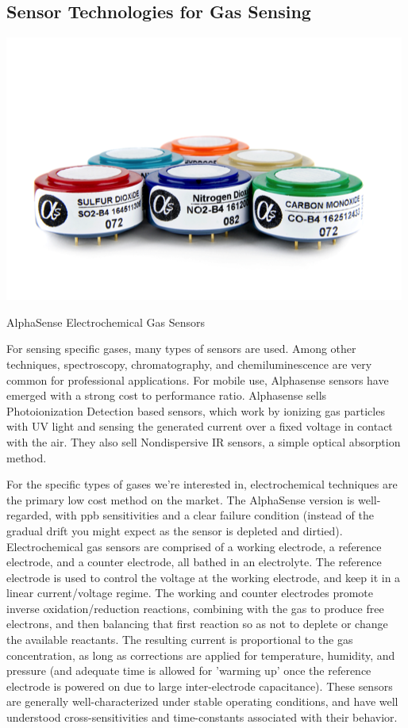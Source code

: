 \subsection{Sensor Technologies for Gas Sensing}

\begin{marginfigure}[3.5cm]
 	\includegraphics[width=\textwidth]{visuals/as_gas}               
 	 \caption{AlphaSense Electrochemical Gas Sensors}
  	\label{fig:as_gas}
\end{marginfigure}

For sensing specific gases, many types of sensors are used.  Among other techniques, spectroscopy, chromatography, and chemiluminescence are very common for professional applications.  For mobile use, Alphasense sensors have emerged with a strong cost to performance ratio.  Alphasense sells Photoionization Detection based sensors, which work by ionizing gas particles with UV light and sensing the generated current over a fixed voltage in contact with the air. They also sell Nondispersive IR sensors, a simple optical absorption method.  

For the specific types of gases we're interested in, electrochemical techniques are the primary low cost method on the market.  The AlphaSense version is well-regarded, with ppb sensitivities and a clear failure condition (instead of the gradual drift you might expect as the sensor is depleted and dirtied). Electrochemical gas sensors are comprised of a working electrode, a reference electrode, and a counter electrode, all bathed in an electrolyte.  The reference electrode is used to control the voltage at the working electrode, and keep it in a linear current/voltage regime.  The working and counter electrodes promote inverse oxidation/reduction reactions, combining with the gas to produce free electrons, and then balancing that first reaction so as not to deplete or change the available reactants. The resulting current is proportional to the gas concentration, as long as corrections are applied for temperature, humidity, and pressure (and adequate time is allowed for 'warming up' once the reference electrode is powered on due to large inter-electrode capacitance). \cite{alpha2014} These sensors are generally well-characterized under stable operating conditions, and have well understood cross-sensitivities and time-constants associated with their behavior.

